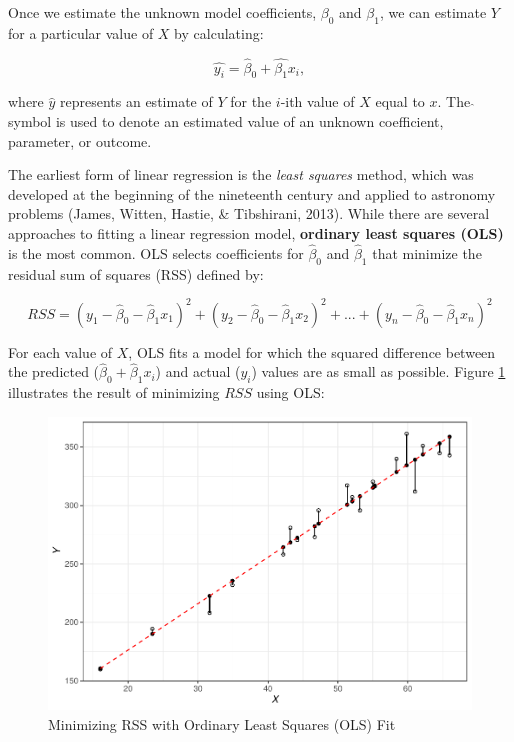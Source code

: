 \documentclass[
]{book}
\begin{document}
Once we estimate the unknown model coefficients, \(\beta_0\) and \(\beta_1\), we can estimate \(Y\) for a particular value of \(X\) by calculating:

\[ \hat{y_i} = \hat{\beta}_0 + \hat{\beta_1}x_i, \]

where \(\hat{y}\) represents an estimate of \(Y\) for the \(i\)-ith value of \(X\) equal to \(x\). The \(\hat{}\) symbol is used to denote an estimated value of an unknown coefficient, parameter, or outcome.

The earliest form of linear regression is the \emph{least squares} method, which was developed at the beginning of the nineteenth century and applied to astronomy problems (James, Witten, Hastie, \& Tibshirani, 2013). While there are several approaches to fitting a linear regression model, \textbf{ordinary least squares (OLS)} is the most common. OLS selects coefficients for \(\hat{\beta}_0\) and \(\hat{\beta}_1\) that minimize the residual sum of squares (RSS) defined by:

\[RSS = (y_1 - \hat{\beta}_0 - \hat{\beta}_1x_1)^2 + (y_2 - \hat{\beta}_0 - \hat{\beta}_1x_2)^2 + {...} + (y_n - \hat{\beta}_0 - \hat{\beta}_1x_n)^2\]

For each value of \(X\), OLS fits a model for which the squared difference between the predicted (\(\hat{\beta}_0 + \hat{\beta}_1x_i\)) and actual (\(y_i\)) values are as small as possible. Figure \ref{fig:lm-residuals} illustrates the result of minimizing \(RSS\) using OLS:

\begin{figure}

{\centering \includegraphics[width=1\linewidth]{People_Analytics_Lifecycle_files/figure-latex/lm-residuals-1} 

}

\caption{Minimizing RSS with Ordinary Least Squares (OLS) Fit}\label{fig:lm-residuals}
\end{figure}
\end{document}
